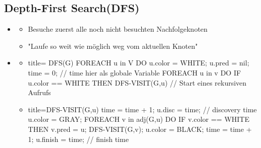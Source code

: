 \documentclass[
    12pt,
    a4paper,
    ngerman,
    color=3b,%
    marginpar=false,
    colorback=false,
    leqno,
]{tudaexercise}
\begin{document}
\subsection{Depth-First Search(DFS)}
    \begin{itemize}
        \item {}
            \begin{itemize}
                \item Besuche zuerst alle noch nicht besuchten Nachfolgeknoten
                \item \string"Laufe so weit wie möglich weg vom aktuellen Knoten\string"
            \end{itemize}

        \item {}
            \begin{itemize}
                \item[]
                    \begin{ccode}[autogobble]{title={ DFS(G)}}
                    FOREACH u in V DO
                        u.color = WHITE;
                        u.pred = nil;
                    time = 0;               // time hier als globale Variable
                    FOREACH u in v DO
                        IF u.color == WHITE THEN
                            DFS-VISIT(G,u)  // Start eines rekursiven Aufrufs
                    \end{ccode}
                \item[]
                    \begin{ccode}[autogobble]{title={DFS-VISIT(G,u)}}
                    time = time + 1;
                    u.disc = time;          // discovery time
                    u.color = GRAY;
                    FOREACH v in adj(G,u) DO
                        IF v.color == WHITE THEN
                            v.pred = u;
                            DFS-VISIT(G,v);
                    u.color = BLACK;
                    time = time + 1;
                    u.finish = time;        // finish time
                    \end{ccode}
            \end{itemize}


\end{itemize}
\end{document}
